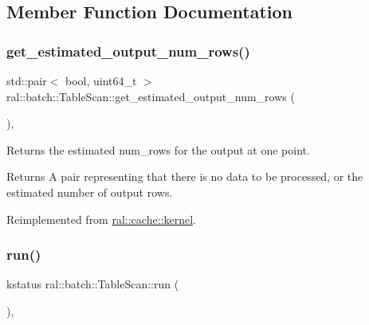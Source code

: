 \subsection{Member Function Documentation}
\mbox{\label{classral_1_1batch_1_1TableScan_a7e0bd59ce5ca3d44b0530927f5edd481}} 
\subsubsection{\texorpdfstring{get\+\_\+estimated\+\_\+output\+\_\+num\+\_\+rows()}{get\_estimated\_output\_num\_rows()}}
{\footnotesize\ttfamily std\+::pair$<$ bool, uint64\+\_\+t $>$ ral\+::batch\+::\+Table\+Scan\+::get\+\_\+estimated\+\_\+output\+\_\+num\+\_\+rows (\begin{DoxyParamCaption}{ }\end{DoxyParamCaption})\hspace{0.3cm}{\ttfamily [override]}, {\ttfamily [virtual]}}

Returns the estimated num\+\_\+rows for the output at one point. \begin{DoxyReturn}{Returns}
A pair representing that there is no data to be processed, or the estimated number of output rows. 
\end{DoxyReturn}


Reimplemented from \hyperlink{classral_1_1cache_1_1kernel_abf40aaa022e3bf38c261977d0c2170cb}{ral\+::cache\+::kernel}.

\mbox{\label{classral_1_1batch_1_1TableScan_a0dd1b7ffeaec582922ee586b452245c0}} 
\subsubsection{\texorpdfstring{run()}{run()}}
{\footnotesize\ttfamily kstatus ral\+::batch\+::\+Table\+Scan\+::run (\begin{DoxyParamCaption}{ }\end{DoxyParamCaption})\hspace{0.3cm}{\ttfamily [override]}, {\ttfamily [virtual]}}

